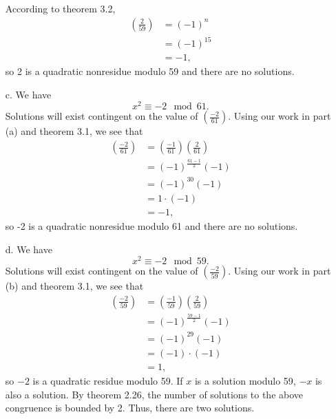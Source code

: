 \documentclass[12 pt]{amsart}
\begin{document}
\begin{enumerate}
      According to theorem 3.2, 
      \begin{align*}
        \left( \frac{2}{59} \right) &= (-1)^{n} \\
                                    &= (-1)^{15} \\
                                    &= -1,
      \end{align*}
      so 2 is a quadratic nonresidue modulo 59 and there are no solutions.
		\item[c.]
      We have 
      \[
        x^2 \equiv -2 \mod 61.
      \]
      Solutions will exist contingent on the value of
      $\left( \frac{-2}{61} \right)$. 
      Using our work in part (a) and 
      theorem 3.1, we see that
      \begin{align*}
        \left( \frac{-2}{61} \right) &= \left( \frac{-1}{61} \right)
                                        \left( \frac{2}{61} \right) \\
                                     &= (-1)^{\frac{61-1}{2}} (-1) \\
                                     &= (-1)^{30} (-1) \\
                                     &= 1 \cdot (-1) \\
                                     &= -1,
      \end{align*}
      so -2 is a quadratic nonresidue modulo 61 and there are no solutions.
		\item[d.]
      We have 
      \[
        x^2 \equiv -2 \mod 59.
      \]
      Solutions will exist contingent on the value of
      $\left( \frac{-2}{59} \right)$. 
      Using our work in part (b) and 
      theorem 3.1, we see that
      \begin{align*}
        \left( \frac{-2}{59} \right) &= \left( \frac{-1}{59} \right)
                                        \left( \frac{2}{59} \right) \\
                                     &= (-1)^{\frac{59-1}{2}} (-1) \\
                                     &= (-1)^{29} (-1) \\
                                     &= (-1) \cdot (-1) \\
                                     &= 1,
      \end{align*}
      so $-2$ is a quadratic residue modulo 59.
      If $x$ is a solution modulo 59, $-x$ is also a solution.
      By theorem 2.26, the number of solutions to the above
      congruence is bounded by 2.
      Thus, there are two solutions.

\end{enumerate}
\end{document}
